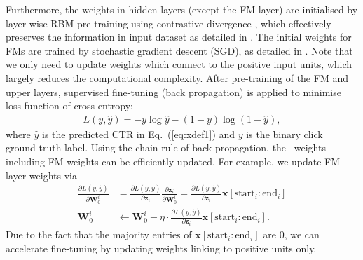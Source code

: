 \documentclass{llncs}
\renewcommand{\algorithmicrequire}{\textbf{Input:}}
\renewcommand{\algorithmicensure}{\textbf{Output:}}
\newcommand{\bs}{\boldsymbol}
\newcommand{\fmnn}{\text{FNN}}
\begin{document}
Furthermore, the weights in hidden layers (except the FM layer) are initialised by layer-wise RBM pre-training \cite{bengio2007greedy} using contrastive divergence \cite{hinton2002training}, which effectively preserves the information in input dataset as detailed in \cite{hinton2006reducing,hinton2010practical}.  The initial weights for FMs are trained by stochastic gradient descent (SGD), as detailed in \cite{rendle2012factorization}. Note that we only need to update weights which connect to the positive input units, which largely reduces the computational complexity. After pre-training of the FM and upper layers, supervised fine-tuning (back propagation) is applied to minimise loss function of cross entropy:
\begin{align}
L(y,\hat{y})= -y\log \hat{y} - (1-y)\log(1-\hat{y})  \label{eq:xdefloss},
\end{align}
where $\hat{y}$ is the predicted CTR in Eq.~(\ref{eq:xdef1}) and $y$ is the binary click ground-truth label. Using the chain rule of back propagation, the \fmnn~weights including FM weights can be efficiently updated. For example, we update FM layer weights via
\begin{align}
\frac{\partial L(y,\hat{y})}{\partial \bs{W}_{0}^{i}} &=  \frac{\partial L(y,\hat{y})}{\partial \bs{z}_i} \frac{\partial \bs{z}_i}{\partial \bs{W}_{0}^{i}} =\frac{\partial L(y,\hat{y})}{\partial \bs{z}_i} \bs{x}[\text{start}_i:\text{end}_i] \\
\bs{W}_{0}^{i} &\leftarrow \bs{W}_{0}^{i}-\eta \cdot \frac{\partial L(y,\hat{y})}{\partial \bs{z}_i} \bs{x}[\text{start}_i:\text{end}_i].  \label{eq:def_grad}
\end{align}
Due to the fact that the majority entries of $\bs{x}[\text{start}_i:\text{end}_i]$ are 0, we can accelerate fine-tuning by updating weights linking to positive units only.

%
\end{document}
